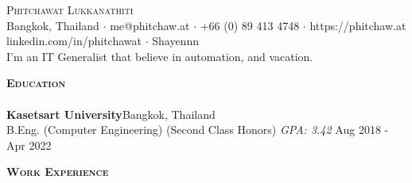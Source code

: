 \documentclass[a4paper]{article}
\newcommand{\lineunder} {
    \vspace*{-8pt} \\
    \hspace*{-18pt} \hrulefill \\
}
\newcommand{\header} [1] {
    {\hspace*{-18pt}\vspace*{6pt} \textsc{\textbf{#1}}}
    \vspace*{-6pt} \lineunder
}
\begin{document}
\vspace*{-40pt}

    

\vspace*{-10pt}
\begin{center}
	{\Huge \scshape {Phitchawat Lukkanathiti}}\\
	Bangkok, Thailand $\cdot$ me@phitchaw.at $\cdot$ +66 (0) 89 413 4748 $\cdot$ https://phitchaw.at \\
        \faLinkedinSquare \vspace{0.4mm} linkedin.com/in/phitchawat $\cdot$ \faGithub \vspace{0.4mm} Shayennn\\
        \vspace{4mm}
        I'm an IT Generalist that believe in automation, and vacation.
\end{center}
\vspace{2mm}

\header{Education}
\textbf{Kasetsart University}\hfill Bangkok, Thailand\\
B.Eng. (Computer Engineering) (Second Class Honors) \textit{GPA: 3.42} \hfill Aug 2018 - Apr 2022\\
\vspace{2mm}

\header{Work Experience}
\vspace{1mm}
\end{document}
